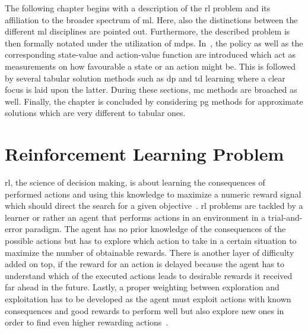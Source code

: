 \documentclass[draft,final]{vutinfth} %
\newcommand{\p}[1]{see p. #1}
\begin{document}
    The following chapter begins with a description of the \gls{rl} problem and its affiliation to the broader spectrum of \gls{ml}.
    Here, also the distinctions between the different \gls{ml} disciplines are pointed out.
    Furthermore, the described problem is then formally notated under the utilization of \glspl{mdp}.
    In~, the policy as well as the corresponding state-value and action-value function are introduced which act as measurements on how favourable a state or an action might be.
    This is followed by several tabular solution methods such as \gls{dp} and \gls{td} learning where a clear focus is laid upon the latter.
    During these sections, \gls{mc} methods are broached as well.
    Finally, the chapter is concluded by considering \gls{pg} methods for approximate solutions which are very different to tabular ones.


    \section{Reinforcement Learning Problem}\label{sec:reinforcement-learning-problem}
    \gls{rl}, the science of decision making, is about learning the consequences of performed actions and using this knowledge to maximize a numeric reward signal which should direct the search for a given objective~\citep[\p{1f}]{sutton_reinforcement_2018}.
    \gls{rl} problems are tackled by a learner or rather an agent that performs actions in an environment in a trial-and-error paradigm.
    The agent has no prior knowledge of the consequences of the possible actions but has to explore which action to take in a certain situation to maximize the number of obtainable rewards.
    There is another layer of difficulty added on top, if the reward for an action is delayed because the agent has to understand which of the executed actions leads to desirable rewards it received far ahead in the future.
    Lastly, a proper weighting between exploration and exploitation has to be developed as the agent must exploit actions with known consequences and good rewards to perform well but also explore new ones in order to find even higher rewarding actions~\citep{kaelbling_reinforcement_1996}.
\end{document}

